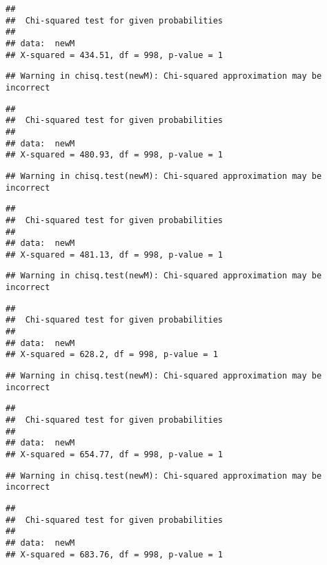 \documentclass[]{article}
\begin{document}
\begin{verbatim}
## 
##  Chi-squared test for given probabilities
## 
## data:  newM
## X-squared = 434.51, df = 998, p-value = 1
\end{verbatim}

\begin{verbatim}
## Warning in chisq.test(newM): Chi-squared approximation may be incorrect
\end{verbatim}

\begin{verbatim}
## 
##  Chi-squared test for given probabilities
## 
## data:  newM
## X-squared = 480.93, df = 998, p-value = 1
\end{verbatim}

\begin{verbatim}
## Warning in chisq.test(newM): Chi-squared approximation may be incorrect
\end{verbatim}

\begin{verbatim}
## 
##  Chi-squared test for given probabilities
## 
## data:  newM
## X-squared = 481.13, df = 998, p-value = 1
\end{verbatim}

\begin{verbatim}
## Warning in chisq.test(newM): Chi-squared approximation may be incorrect
\end{verbatim}

\begin{verbatim}
## 
##  Chi-squared test for given probabilities
## 
## data:  newM
## X-squared = 628.2, df = 998, p-value = 1
\end{verbatim}

\begin{verbatim}
## Warning in chisq.test(newM): Chi-squared approximation may be incorrect
\end{verbatim}

\begin{verbatim}
## 
##  Chi-squared test for given probabilities
## 
## data:  newM
## X-squared = 654.77, df = 998, p-value = 1
\end{verbatim}

\begin{verbatim}
## Warning in chisq.test(newM): Chi-squared approximation may be incorrect
\end{verbatim}

\begin{verbatim}
## 
##  Chi-squared test for given probabilities
## 
## data:  newM
## X-squared = 683.76, df = 998, p-value = 1
\end{verbatim}
\end{document}
